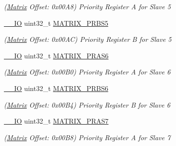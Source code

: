 \begin{DoxyCompactItemize}
\begin{DoxyCompactList}\small\item\em (\mbox{\hyperlink{structMatrix}{Matrix}} Offset\+: 0x00\+A8) Priority Register A for Slave 5 \end{DoxyCompactList}\item 
\mbox{\label{structMatrix_a2401f674682ad2ad6ac204456bf87158}} 
\mbox{\hyperlink{core__cm7_8h_aec43007d9998a0a0e01faede4133d6be}{\+\_\+\+\_\+\+IO}} uint32\+\_\+t \mbox{\hyperlink{structMatrix_a2401f674682ad2ad6ac204456bf87158}{M\+A\+T\+R\+I\+X\+\_\+\+P\+R\+B\+S5}}
\begin{DoxyCompactList}\small\item\em (\mbox{\hyperlink{structMatrix}{Matrix}} Offset\+: 0x00\+AC) Priority Register B for Slave 5 \end{DoxyCompactList}\item 
\mbox{\label{structMatrix_a5fc91bc26ed8652baadbb17486141648}} 
\mbox{\hyperlink{core__cm7_8h_aec43007d9998a0a0e01faede4133d6be}{\+\_\+\+\_\+\+IO}} uint32\+\_\+t \mbox{\hyperlink{structMatrix_a5fc91bc26ed8652baadbb17486141648}{M\+A\+T\+R\+I\+X\+\_\+\+P\+R\+A\+S6}}
\begin{DoxyCompactList}\small\item\em (\mbox{\hyperlink{structMatrix}{Matrix}} Offset\+: 0x00\+B0) Priority Register A for Slave 6 \end{DoxyCompactList}\item 
\mbox{\label{structMatrix_a4d443f7a006a5551fb3d06a22834c365}} 
\mbox{\hyperlink{core__cm7_8h_aec43007d9998a0a0e01faede4133d6be}{\+\_\+\+\_\+\+IO}} uint32\+\_\+t \mbox{\hyperlink{structMatrix_a4d443f7a006a5551fb3d06a22834c365}{M\+A\+T\+R\+I\+X\+\_\+\+P\+R\+B\+S6}}
\begin{DoxyCompactList}\small\item\em (\mbox{\hyperlink{structMatrix}{Matrix}} Offset\+: 0x00\+B4) Priority Register B for Slave 6 \end{DoxyCompactList}\item 
\mbox{\label{structMatrix_a11ac126c7347648ddb64701311e36b0d}} 
\mbox{\hyperlink{core__cm7_8h_aec43007d9998a0a0e01faede4133d6be}{\+\_\+\+\_\+\+IO}} uint32\+\_\+t \mbox{\hyperlink{structMatrix_a11ac126c7347648ddb64701311e36b0d}{M\+A\+T\+R\+I\+X\+\_\+\+P\+R\+A\+S7}}
\begin{DoxyCompactList}\small\item\em (\mbox{\hyperlink{structMatrix}{Matrix}} Offset\+: 0x00\+B8) Priority Register A for Slave 7 \end{DoxyCompactList}\item 

\end{DoxyCompactItemize}
